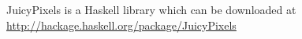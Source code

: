 \documentclass[12pt, a4paper]{article}
\begin{document}

	

\begin{thebibliography}{references}
 JuicyPixels is a Haskell library which can be downloaded at \url{http://hackage.haskell.org/package/JuicyPixels}
\end{thebibliography}
\end{document}
